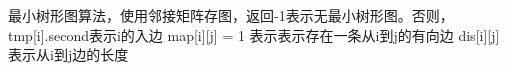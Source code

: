 最小树形图算法，使用邻接矩阵存图，返回-1表示无最小树形图。否则，tmp[i].second表示i的入边
map[i][j] = 1 表示表示存在一条从i到j的有向边
dis[i][j] 表示从i到j边的长度
